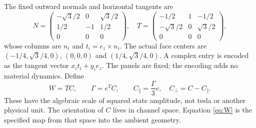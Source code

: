 \documentclass[11pt,a4paper]{article}
\begin{document}
The fixed outward normals and horizontal tangents are
\begin{equation}
 N=\begin{pmatrix}-\sqrt3/2&0&\sqrt3/2\\1/2&-1&1/2\\0&0&0\end{pmatrix},\quad
 T=\begin{pmatrix}-1/2&1&-1/2\\-\sqrt3/2&0&\sqrt3/2\\0&0&0\end{pmatrix},\label{eq:T}
\end{equation}
whose columns are $n_i$ and $t_i=e_z\times n_i$. The actual face centers are $(-1/4,\sqrt3/4,0)$, $(0,0,0)$ and $(1/4,\sqrt3/4,0)$. A complex entry is encoded as the tangent vector $x_it_i+y_ie_z$. The panels are fixed; the encoding adds no material dynamics. Define
\begin{equation}
 W=TC,\qquad \Gamma=e^TC,\qquad
 C_\parallel=\frac{\Gamma}{3}e,\quad C_\perp=C-C_\parallel.\label{eq:W}
\end{equation}
These have the algebraic scale of squared state amplitude, not tesla or another physical unit. The orientation of $C$ lives in channel space. Equation \eqref{eq:W} is the specified map from that space into the ambient geometry.
\end{document}
